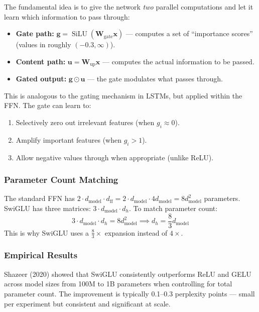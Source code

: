 \documentclass[11pt, a4paper]{article}
\theoremstyle{definition}
\newcommand{\vx}{\bm{x}}
\newcommand{\mW}{\bm{W}}
\newcommand{\dmodel}{d_{\text{model}}}
\newcommand{\dff}{d_{\text{ff}}}
\DeclareMathOperator{\SiLU}{SiLU}
\begin{document}
The fundamental idea is to give the network \emph{two} parallel computations and let it learn which information to pass through:

\begin{itemize}
    \item \textbf{Gate path:} $\bm{g} = \SiLU(\mW_{\text{gate}} \vx)$ — computes a set of ``importance scores'' (values in roughly $(-0.3, \infty)$).
    \item \textbf{Content path:} $\bm{u} = \mW_{\text{up}} \vx$ — computes the actual information to be passed.
    \item \textbf{Gated output:} $\bm{g} \odot \bm{u}$ — the gate modulates what passes through.
\end{itemize}

This is analogous to the gating mechanism in LSTMs, but applied within the FFN. The gate can learn to:
\begin{enumerate}
    \item Selectively zero out irrelevant features (when $g_i \approx 0$).
    \item Amplify important features (when $g_i > 1$).
    \item Allow negative values through when appropriate (unlike ReLU).
\end{enumerate}

\subsubsection{Parameter Count Matching}

The standard FFN has $2 \cdot \dmodel \cdot \dff = 2 \cdot \dmodel \cdot 4\dmodel = 8\dmodel^2$ parameters. SwiGLU has three matrices: $3 \cdot \dmodel \cdot d_h$. To match parameter count:
\begin{equation}
    3 \cdot \dmodel \cdot d_h = 8\dmodel^2 \implies d_h = \frac{8}{3}\dmodel
\end{equation}
This is why SwiGLU uses a $\frac{8}{3}\times$ expansion instead of $4\times$.

\subsubsection{Empirical Results}

Shazeer (2020) showed that SwiGLU consistently outperforms ReLU and GELU across model sizes from 100M to 1B parameters when controlling for total parameter count. The improvement is typically 0.1--0.3 perplexity points — small per experiment but consistent and significant at scale.
\end{document}
